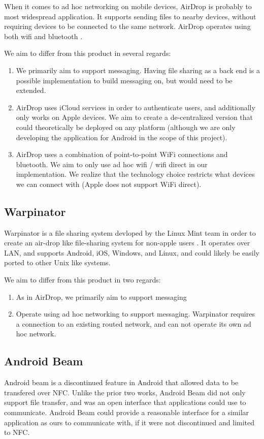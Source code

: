 \documentclass[10pt]{article}
\begin{document}
When it comes to ad hoc networking on mobile devices, AirDrop is probably to most widespread application. It supports sending files to nearby devices, without
requiring devices to be connected to the same network. AirDrop operates using both wifi and bluetooth \cite{AppleSupport}.

We aim to differ from this product in several regards:
\begin{enumerate}
    \item We primarily aim to support messaging. Having file sharing as a back end is a possible implementation to build messaging on, but would need to be extended.
    \item AirDrop uses iCloud services in order to authenticate users, and additionally only works on Apple devices. We aim to create a de-centralized version that
          could theoretically be deployed on any platform (although we are only developing the application for Android in the scope of this project).
    \item AirDrop uses a combination of point-to-point WiFi connections and bluetooth. We aim to only use ad hoc wifi / wifi direct in our implementation. We realize
          that the technology choice restricts what devices we can connect with (Apple does not support WiFi direct).
\end{enumerate}

\subsection{Warpinator}

Warpinator is a file sharing system devloped by the Linux Mint team in order to create an air-drop like file-sharing system for non-apple users  \cite{Webster2023linuxmint}. It operates over
LAN, and supports Android, iOS, Windows, and Linux, and could likely be easily ported to other Unix like systems.

We aim to differ from this product in two regards:
\begin{enumerate}
    \item As in AirDrop, we primarily aim to support messaging
    \item Operate using ad hoc networking to support messaging. Warpinator requires a connection to an existing routed network, and can not operate its own ad hoc
          network.
\end{enumerate}

\subsection{Android Beam}
Android beam is a discontinued feature in Android that allowed data to be transfered over NFC. Unlike the prior two works, Android Beam did not only support file
transfer, and was an open interface that applications could use to communicate. Android Beam could provide a reasonable interface for a similar application as ours
to communicate with, if it were not discontinued and limited to NFC.
\end{document}
